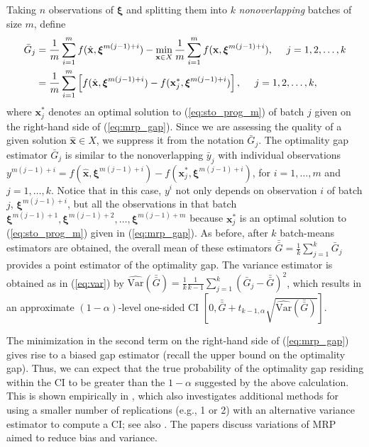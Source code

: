 \documentclass[12pt]{article}
\newcommand{\varh}[1]{\widehat{\mathrm{Var}} \left( #1 \right)}
\newcommand{\X}{X}
\newcommand{\x}{\mathbf{x}}
\newcommand{\xh}{{\hat{\x}}}
\newcommand{\xs}{\x^*}
\newcommand{\xit}{\boldsymbol{\xi}}
\newcommand{\gb}{\bar{G}}
\newcommand{\gbb}{\bar{\gb}}
\newcommand{\yb}{\bar{y}}
\begin{document}
Taking $n$ observations of $\xit$ and splitting them into $k$ {\it nonoverlapping} batches of size $m$, define
\begin{align} 
	\gb_j  & = \frac{1}{m} \sum_{i = 1}^{m} f(\xh, \xit^{m(j-1)+i}) - \min_{\x \in X} \frac{1}{m} \sum_{i=1}^{m} f(\x, \xit^{m(j-1)+i}), \ \ \ \ j = 1,2, \dots, k \label{eq:mrp_gap}\\
         & = \frac{1}{m} \sum_{i = 1}^{m} \left[ f(\xh, \xit^{m(j-1)+i}) -  f(\xs_j, \xit^{m(j-1)+i}) \right], \ \ \ \ j = 1,2, \dots, k, \notag
\end{align}
where $\xs_j$ denotes an optimal solution to (\ref{eq:sto_prog_m}) of batch $j$ given on the right-hand side of (\ref{eq:mrp_gap}).    
Since we are assessing the quality of a given solution $\xh \in \X$, we suppress it from the notation $\gb_j$.
The optimality gap estimator $\gb_j$ is similar to the nonoverlapping $\yb_j$ with individual observations $y^{m(j-1)+i} = f(\xh,\xit^{m(j-1)+i}) - f(\xs_j,\xit^{m(j-1)+i})$, for $i=1,\ldots,m$ and $j=1,\ldots, k$.
Notice that in this case, $y^i$ not only depends on observation $i$ of batch $j$, $\xit^{m(j-1)+i}$, but all the observations in that batch $\xit^{m(j-1)+1},\xit^{m(j-1)+2},\ldots,\xit^{m(j-1)+m}$ because $\xs_j$ is an optimal solution to (\ref{eq:sto_prog_m}) given in (\ref{eq:mrp_gap}).   
As before, after $k$ batch-means estimators are obtained, the overall mean of these estimators $\gbb = \frac{1}{k} \sum_{j=1}^k \gb_j$ provides a point estimator of the optimality gap.  
The variance estimator is obtained as in (\ref{eq:var}) by $\varh{\gbb} = \frac{1}{k} \frac{1}{k-1} \sum_{j=1}^k (\gb_j - \gbb)^2$, which results in an approximate $(1-\alpha)$-level one-sided CI $\left[0, \gbb + t_{k-1,\alpha} \sqrt{\varh{\gbb}} \right]$.

The minimization in the second term on the right-hand side of (\ref{eq:mrp_gap}) gives rise to a biased gap estimator (recall the upper bound on the optimality gap).  
Thus, we can expect that the true probability of the optimality gap residing within the CI to be greater than the $1 - \alpha$ suggested by the above calculation.  
This is shown empirically in \citep{Bayraksan2006}, which also investigates additional methods for using a smaller number of replications (e.g., 1 or 2) with an alternative variance estimator to compute a CI; see also \citep{stockbridge_bayraksan_13}. 
The papers \citep{bayraksan_morton_09,partani2006jackknife,partani_07} discuss variations of MRP aimed to reduce bias and variance.

\end{document}
